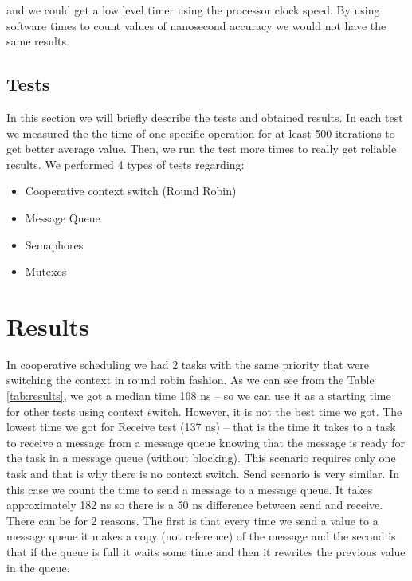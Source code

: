 \documentclass[conference]{IEEEtran}
\begin{document}
\noindent and we could get a low level timer using the processor clock speed. By using software times to count values of nanosecond accuracy we would not have the same results.

\subsection{Tests}
In this section we will briefly describe the tests and obtained results. In each test we measured the the time of one specific operation for at least 500 iterations to get better average value. Then, we run the test more times to really get reliable results. We performed 4 types of tests regarding:
\begin{itemize}
    \item Cooperative context switch (Round Robin)
    \item Message Queue
    \item Semaphores
    \item Mutexes
\end{itemize}
\vspace{-2.30mm}

\section{Results}

In cooperative scheduling we had 2 tasks with the same priority that were switching the context in round robin fashion. As we can see from the Table \ref{tab:results}, we got a median time 168 ns -- so we can use it as a starting time for other tests using context switch. However, it is not the best time we got. The lowest time we got for Receive test (137 ns) -- that is the time it takes to a task to receive a message from a message queue knowing that the message is ready for the task in a message queue (without blocking). This scenario requires only one task and that is why there is no context switch. Send scenario is very similar. In this case we count the time to send a message to a message queue. It takes approximately 182 ns so there is a 50 ns difference between send and receive. There can be for 2 reasons. The first is that every time we send a value to a message queue it makes a copy (not reference) of the message and the second is that if the queue is full it waits some time and then it rewrites the previous value in the queue. 
\end{document}

